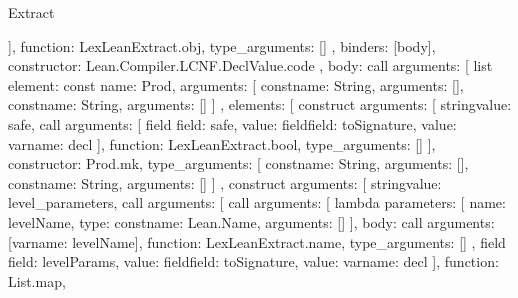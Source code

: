 \begin{lexlean}{Extract}
\begin{toolingmodule}
{{{{{{{                  }
                ],
                function: LexLeanExtract.obj,
                type_arguments: []
              },
              binders: [body],
              constructor: Lean.Compiler.LCNF.DeclValue.code
            },
            {
              body: call{
                arguments: [
                  list{
                    element: const{
                      name: Prod,
                      arguments: [
                        const{name: String, arguments: []},
                        const{name: String, arguments: []}
                      ]
                    },
                    elements: [
                      construct{
                        arguments: [
                          string{value: safe},
                          call{
                            arguments: [
                              field{
                                field: safe,
                                value: field{field: toSignature, value: var{name: decl}}
                              }
                            ],
                            function: LexLeanExtract.bool,
                            type_arguments: []
                          }
                        ],
                        constructor: Prod.mk,
                        type_arguments: [
                          const{name: String, arguments: []},
                          const{name: String, arguments: []}
                        ]
                      },
                      construct{
                        arguments: [
                          string{value: level_parameters},
                          call{
                            arguments: [
                              call{
                                arguments: [
                                  lambda{
                                    parameters: [
                                      {name: levelName, type: const{name: Lean.Name, arguments: []}}
                                    ],
                                    body: call{
                                      arguments: [var{name: levelName}],
                                      function: LexLeanExtract.name,
                                      type_arguments: []
                                    }
                                  },
                                  field{
                                    field: levelParams,
                                    value: field{field: toSignature, value: var{name: decl}}
                                  }
                                ],
                                function: List.map,
}}}}}}}}}}
\end{toolingmodule}
\end{lexlean}
